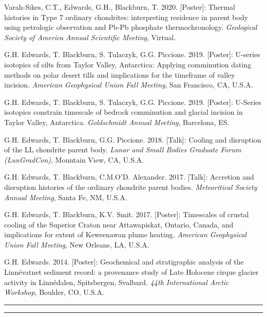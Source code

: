 \documentclass[10pt]{article}
\begin{document}
\begin{etaremune} [itemsep=4pt, leftmargin=3ex]
  \item Varah-Sikes, C.T., Edwards, G.H., Blackburn, T. 2020. [Poster]: Thermal histories in Type 7 ordinary chondrites: interpreting residence in parent body using petrologic observation and Pb-Pb phosphate thermochronology. \textit{Geological Society of America Annual Scientific Meeting}, Virtual.
  \item G.H. Edwards, T. Blackburn, S. Tulaczyk, G.G. Piccione. 2019. [Poster]: U-series isotopics of silts from Taylor Valley, Antarctica: Applying comminution dating methods on polar desert tills and implications for the timeframe of valley incision. \textit{American Geophysical Union Fall Meeting}, San Francisco, CA, U.S.A.
  \item  G.H. Edwards, T. Blackburn, S. Tulaczyk, G.G. Piccione. 2019. [Poster]: U-Series isotopics constrain timescale of bedrock comminution and glacial incision in Taylor Valley, Antarctica. \textit{Goldschmidt Annual Meeting}, Barcelona, ES.
	\item  G.H. Edwards, T. Blackburn, G.G. Piccione. 2018. [Talk]: Cooling and disruption of the LL chondrite parent body. \textit{Lunar and Small Bodies Graduate Forum (LunGradCon)}, Mountain View, CA, U.S.A.
  \item  G.H. Edwards, T. Blackburn, C.M.O’D. Alexander. 2017. [Talk]: Accretion and disruption histories of the ordinary chondrite parent bodies. \textit{Meteoritical Society Annual Meeting}, Santa Fe, NM, U.S.A.
  \item G.H. Edwards, T. Blackburn, K.V. Smit. 2017. [Poster]: Timescales of crustal cooling of the Superior Craton near Attawapiskat, Ontario, Canada, and implications for extent of Keweenawan plume heating. \textit{American Geophysical Union Fall Meeting}, New Orleans, LA, U.S.A.
  \item G.H. Edwards. 2014. [Poster]: Geochemical and stratigraphic analysis of the Linnévatnet sediment record: a provenance study of Late Holocene cirque glacier activity in Linnédalen, Spitsbergen, Svalbard. \textit{44th International Arctic Workshop}, Boulder, CO, U.S.A.
\end{etaremune}
\vspace{-12pt}

\begin{center}{\rule{2.5in}{0.5pt}}\end{center}  \begin{center}{\rule{2.5in}{0.5pt}}\end{center}
	
\end{document}
